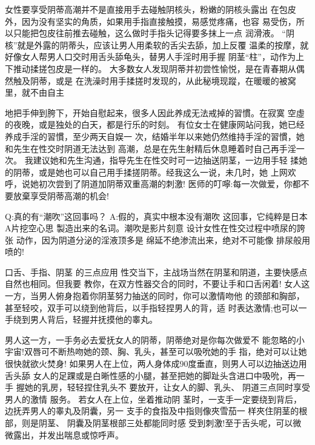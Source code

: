 \documentclass[12pt,UTF8]{ctexbook}
\begin{document}
女性要享受阴蒂高潮并不是直接用手去碰触阴核头，粉嫩的阴核头露出
在包皮外，因为没有坚实的角质，如果用手指直接触摸，易感觉疼痛，也容
易受伤，所以只能把包皮往前推去碰触，这么做时手指头记得要多抹上一点
润滑液。
“阴核”就是外露的阴蒂头，应该让男人用柔软的舌尖去舔，加上反覆
温柔的按摩，就好像女人帮男人口交时用舌头舔龟头，替男人手淫时用手握
阴茎“柱”，动作为上下推动揉搓包皮是一样的。
大多数女人发现阴蒂并初尝性愉悦，是在青春期从偶然触及阴蒂，或是
在洗澡时用手揉搓时发现的，从此秘境现蹤，在暖暖的被窝里，就不由自主

地把手伸到胯下，开始自慰起来，很多人因此养成无法戒掉的習慣。在寂寞
空虛的夜晚，或是独处的白天，都是行乐的时刻。
有位女士在健康网站问我，她已经养成手淫的習慣，至少两天自娱一
次，结婚半年以来她仍然维持手淫的習慣，她和先生在性交时阴道无法达到
高潮，总是在先生射精后休息睡着时自己再手淫一次。
我建议她和先生沟通，指导先生在性交时可一边抽送阴茎，一边用手轻
揉她的阴蒂，或是她也可以自己用手揉搓阴蒂。经我这么一说，未几时，她
上网欢呼，说她初次尝到了阴道加阴蒂双重高潮的刺激!
医师的叮嚀:每一次做爱，你都不要放棄享受阴蒂高潮的机会!

Q:真的有“潮吹”这回事吗？
A:假的，真实中根本没有潮吹
这回事，它纯粹是日本A片挖空心思
製造出来的名词。潮吹是影片刻意
设计女性在性交过程中喷尿的誇张
动作，因为阴道分泌的淫液顶多是
绵延不绝渗流出来，绝对不可能像
排尿般用喷的!

口舌、手指、阴茎
的三点应用
性交当下，主战场当然在阴茎和阴道，主要快感点自然也相同。但我要
教你，在双方性器交合的同时，不要让手和口舌闲着!
女人这一方，当男人俯身抱着你阴茎努力抽送的同时，你可以激情吻他
的颈部和胸部，甚至轻咬，双手可以绕到他背后，以手指轻捏男人的背，适
时表达激情;也可以一手绕到男人背后，轻握并抚摸他的睾丸。

男人这一方，一手务必去爱抚女人的阴蒂，阴蒂绝对是你每次做爱不
能忽略的小宇宙!双唇可不断热吻她的颈、胸、乳头，甚至可以吸吮她的手
指，绝对可以让她很快就欲火焚身!
如果男人在上位，两人身体成90度垂直，则男人可以边抽送边用舌头舔
女人的足踝或是白晰性感的小腿，甚至把她的脚趾头含进口中吸吮，再一手
握她的乳房，轻轻捏住乳头不
要放开，让女人的脚、乳头、
阴道三点同时享受男人的激情
服务。
若女人在上位，坐着推动阴
茎时，一支手一定要绕到背后，
边抚弄男人的睾丸及阴囊，另一
支手的食指及中指则像夾雪茄一
样夾住阴茎的根部，则是阴茎、
阴囊及阴茎根部三处都能同时感
受到刺激!至于舌头呢，可以微
微露出，并发出喘息或惊呼声。
\end{document}

